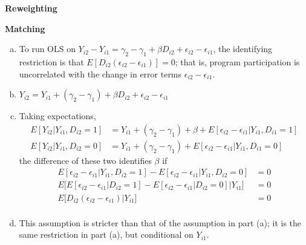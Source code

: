 \documentclass[11pt]{article}
\begin{document}
\begin{center}
\end{center}

\bigskip \textbf{Reweighting}

\bigskip \textbf{Matching}

\begin{enumerate}[(a)]

	\item To run OLS on $Y_{i2} - Y_{i1} = \gamma_2 - \gamma_1 + \beta D_{i2} + \epsilon_{i2} - \epsilon_{i1}$, the identifying restriction is that $E\left[D_{i2} (\epsilon_{i2} - \epsilon_{i1})\right] = 0$; that is, program participation is uncorrelated with the change in error terms $\epsilon_{i2} - \epsilon_{i1}$.

	\item $Y_{i2} = Y_{i1} + (\gamma_2 - \gamma_1) + \beta D_{i2} + \epsilon_{i2} - \epsilon_{i1}$

	\item Taking expectations,
	\begin{align*}
		E\left[Y_{i2} | Y_{i1}, D_{i2} = 1\right] &= Y_{i1} + (\gamma_2 - \gamma_1) + \beta + E[\epsilon_{i2} - \epsilon_{i1} | Y_{i1}, D_{i1}=1]\\
		E\left[Y_{i2} | Y_{i1}, D_{i2} = 0\right] &= Y_{i1} + (\gamma_2 - \gamma_1) + E[\epsilon_{i2} - \epsilon_{i1} | Y_{i1}, D_{i1}=0]
	\end{align*}
	the difference of these two identifies $\beta$ if
	\begin{align*}
		E[\epsilon_{i2} - \epsilon_{i1} | Y_{i1}, D_{i2}=1] - E[\epsilon_{i2} - \epsilon_{i1} | Y_{i1}, D_{i2}=0] &= 0 \\
		E \bigg[ E[\epsilon_{i2} - \epsilon_{i1} | D_{i2}=1] - E[\epsilon_{i2} - \epsilon_{i1} | D_{i2}=0] \bigg| Y_{i1} \bigg]&= 0 \\
		E \bigg[ D_{i2} (\epsilon_{i2} - \epsilon_{i1}) \bigg| Y_{i1} \bigg]&= 0 \\
	\end{align*}
	
	\item This assumption is stricter than that of the assumption in part (a); it is the same restriction in part (a), but conditional on $Y_{i1}$.


\end{enumerate}
\end{document}
